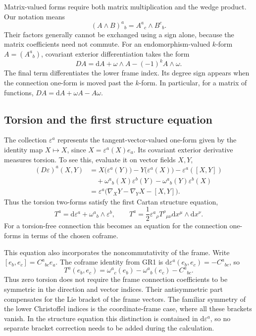 \documentclass[11pt,a4paper]{article}
\numberwithin{equation}{section}
\newcommand{\dd}{\mathrm d}
\begin{document}
Matrix-valued forms require both matrix multiplication and the wedge
product. Our notation means
\[
 (A\wedge B)^a{}_b=A^a{}_c\wedge B^c{}_b.
\]
Their factors generally cannot be exchanged using a sign alone,
because the matrix coefficients need not commute. For an
endomorphism-valued \(k\)-form \(A=(A^a{}_b)\), covariant exterior
differentiation takes the form
\begin{equation}
 DA=\dd A+\omega\wedge A-(-1)^kA\wedge\omega.
 \label{gr2:eq:covariant-exterior-matrix}
\end{equation}
The final term differentiates the lower frame index. Its degree sign
appears when the connection one-form is moved past the \(k\)-form.
In particular, for a matrix of functions,
\(DA=\dd A+\omega A-A\omega\).

\subsection{Torsion and the first structure equation}

The collection \(\varepsilon^a\) represents the tangent-vector-valued
one-form given by the identity map \(X\mapsto X\), since
\(X=\varepsilon^a(X)e_a\). Its covariant exterior derivative measures
torsion. To see this, evaluate it on vector fields \(X,Y\),
\begin{align*}
 (D\varepsilon)^a(X,Y)
 &=X\bigl(\varepsilon^a(Y)\bigr)
   -Y\bigl(\varepsilon^a(X)\bigr)-\varepsilon^a([X,Y])\\
 &\quad+\omega^a{}_b(X)\varepsilon^b(Y)
       -\omega^a{}_b(Y)\varepsilon^b(X)\\
 &=\varepsilon^a\bigl(\nabla_XY-\nabla_YX-[X,Y]\bigr).
\end{align*}
Thus the torsion two-forms satisfy the first Cartan structure equation,
\begin{equation}
 \boxed{T^a=\dd\varepsilon^a+\omega^a{}_b\wedge\varepsilon^b,}
 \qquad
 T^a=\frac12\varepsilon^a{}_\rho T^\rho{}_{\mu\nu}
                  \dd x^\mu\wedge\dd x^\nu.
 \label{gr2:eq:cartan-torsion}
\end{equation}
For a torsion-free connection this becomes an equation for the
connection one-forms in terms of the chosen coframe.

This equation also incorporates the noncommutativity of the frame.
Write \([e_b,e_c]=C^a{}_{bc}e_a\). The coframe identity from GR1 is
\(\dd\varepsilon^a(e_b,e_c)=-C^a{}_{bc}\), so
\[
 T^a(e_b,e_c)
 =\omega^a{}_c(e_b)-\omega^a{}_b(e_c)-C^a{}_{bc}.
\]
Thus zero torsion does not require the frame connection coefficients
to be symmetric in the direction and vector indices. Their
antisymmetric part compensates for the Lie bracket of the frame
vectors. The familiar symmetry of the lower Christoffel indices is
the coordinate-frame case, where all these brackets vanish. In the
structure equation this distinction is contained in
\(\dd\varepsilon^a\), so no separate bracket correction needs to be
added during the calculation.
\end{document}
